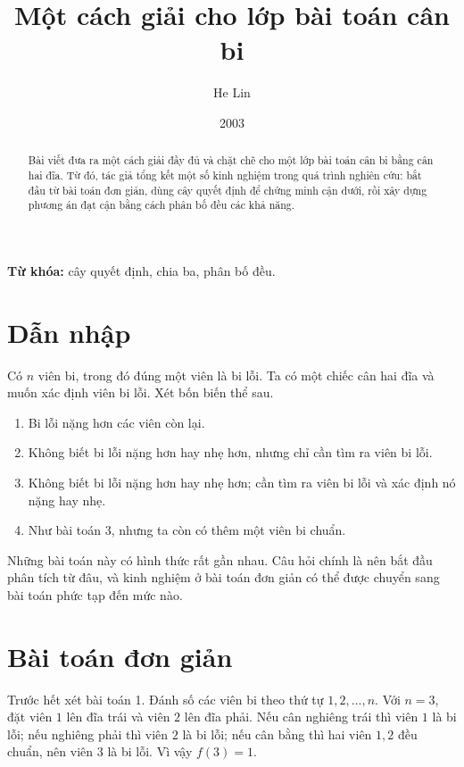 \documentclass[11pt]{article}
\title{Một cách giải cho lớp bài toán cân bi}
\author{He Lin}
\date{2003}
\begin{document}
\maketitle


\begin{abstract}
Bài viết đưa ra một cách giải đầy đủ và chặt chẽ cho một lớp bài toán cân bi
bằng cân hai đĩa. Từ đó, tác giả tổng kết một số kinh nghiệm trong quá trình
nghiên cứu: bắt đầu từ bài toán đơn giản, dùng cây quyết định để chứng minh
cận dưới, rồi xây dựng phương án đạt cận bằng cách phân bố đều các khả năng.
\end{abstract}

\noindent\textbf{Từ khóa:} cây quyết định, chia ba, phân bố đều.

\section{Dẫn nhập}

Có \(n\) viên bi, trong đó đúng một viên là bi lỗi. Ta có một chiếc cân hai
đĩa và muốn xác định viên bi lỗi. Xét bốn biến thể sau.

\begin{enumerate}
  \item Bi lỗi nặng hơn các viên còn lại.
  \item Không biết bi lỗi nặng hơn hay nhẹ hơn, nhưng chỉ cần tìm ra viên bi
  lỗi.
  \item Không biết bi lỗi nặng hơn hay nhẹ hơn; cần tìm ra viên bi lỗi và xác
  định nó nặng hay nhẹ.
  \item Như bài toán 3, nhưng ta còn có thêm một viên bi chuẩn.
\end{enumerate}

Những bài toán này có hình thức rất gần nhau. Câu hỏi chính là nên bắt đầu
phân tích từ đâu, và kinh nghiệm ở bài toán đơn giản có thể được chuyển sang
bài toán phức tạp đến mức nào.

\section{Bài toán đơn giản}

Trước hết xét bài toán 1. Đánh số các viên bi theo thứ tự
\(1,2,\ldots,n\). Với \(n=3\), đặt viên \(1\) lên đĩa trái và viên \(2\) lên
đĩa phải. Nếu cân nghiêng trái thì viên \(1\) là bi lỗi; nếu nghiêng phải thì
viên \(2\) là bi lỗi; nếu cân bằng thì hai viên \(1,2\) đều chuẩn, nên viên
\(3\) là bi lỗi. Vì vậy \(f(3)=1\).
\end{document}
